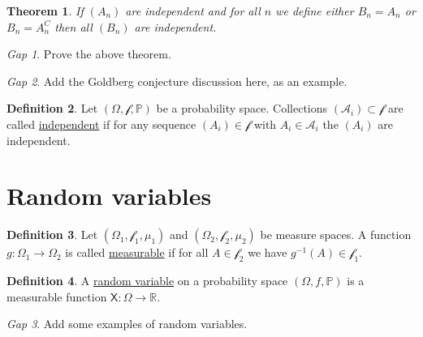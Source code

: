 \documentclass[11pt]{article}
\newcommand{\col}[1]{\mathscr{#1}}
\newcommand{\rv}[1]{\mathsf{#1}}
\newcommand{\p}{\mathbb{P}}
\newcommand{\defname}[1]{\underline{#1}}
\newcommand{\RR}{\mathbb{R}}
\theoremstyle{theorem}
\newtheorem{theorem}{Theorem}[section]
\theoremstyle{definition}
\newtheorem{definition}[theorem]{Definition}
\theoremstyle{remark}
\theoremstyle{step}
\theoremstyle{gap}
\newtheorem*{gap}{Gap}
\begin{document}
\begin{theorem}
If \((A_n)\) are independent and for all \(n\) we define either \(B_n = A_n\) or \(B_n = A_n^C\) then all \((B_n)\) are independent.
\end{theorem}

\begin{gap}
Prove the above theorem.
\end{gap}

\begin{gap}
Add the Goldberg conjecture discussion here, as an example.
\end{gap}

\begin{definition}
Let \((\Omega, \col{f}, \p)\) be a probability space. Collections \((\col{A}_i) \subset \col{f}\) are called \defname{independent} if for any sequence \((A_i)\in\col{f}\) with \(A_i \in \col{A}_i\) the \((A_i)\) are independent.
\end{definition}

\section{Random variables}

\begin{definition}
Let \((\Omega_1, \col{f}_1, \mu_1)\) and \((\Omega_2, \col{f}_2, \mu_2)\) be measure spaces. A function \(g: \Omega_1 \to \Omega_2\) is called \defname{measurable} if for all \(A \in \col{f}_2\) we have \(g^{-1}(A) \in \col{f}_1\).
\end{definition}


\begin{definition}
A \defname{random variable} on a probability space \((\Omega, f, \p)\) is a measurable function \(\rv{X}:\Omega \to \RR\). 
\end{definition}

\begin{gap}
Add some examples of random variables.
\end{gap}
\end{document}
